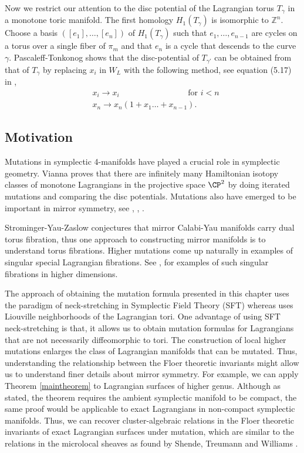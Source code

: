 Now we restrict our attention to the disc potential of the Lagrangian torus $T_\gamma$ in a monotone toric manifold. The first homology $H_1(T_\gamma)$ is isomorphic to $\mathbb{Z}^n$. Choose a basis $([e_1], \dots, [e_n])$ of $H_1(T_\gamma)$ such that $e_1, \dots, e_{n-1}$ are cycles on a torus over a single fiber of $\pi_m$ and that $e_n$ is a cycle that descends to the curve $\gamma$.  Pascaleff-Tonkonog \cite[p.~62]{wall} shows that the  disc-potential of $T_{\gamma'}$ can be obtained from that of $T_\gamma$ by replacing $x_i$ in $W_L$ with the following method,  see equation (5.17) in \cite{wall},
\begin{align}
    &x_i \longrightarrow x_i \qquad\qquad\qquad \qquad  \text{ for } i<n \label{eq:pasctonkmut}\\
    &x_n \longrightarrow x_n(1+x_1\dots + x_{n-1} ) \nonumber. 
\end{align}


\subsection{Motivation}


Mutations in symplectic 4-manifolds have played a crucial role in symplectic geometry.  Vianna \cite{vianna:infinitely} proves that there are infinitely many Hamiltonian isotopy classes of monotone Lagrangians in the projective space $\CP^2$ by doing iterated mutations and comparing the disc potentials.  Mutations also have emerged to be important in mirror symmetry,  see \cite{shetruwil:combi}, \cite{hackeating:hommirrLGcal},  \cite{hackkeating:symplecto}.  

Strominger-Yau-Zaslow \cite{syz:conje} conjectures that mirror Calabi-Yau manifolds carry dual torus fibration,  thus one approach to constructing mirror manifolds is to understand torus fibrations.  Higher mutations come up naturally in examples of singular special Lagrangian fibrations.  See \cite{matessi:lag3fib}\cite{gross:spclgeom}, \cite{gross:spcltop} for examples of such singular fibrations in higher dimensions.   

The approach of obtaining the mutation formula presented in this chapter uses the paradigm of neck-stretching in Symplectic Field Theory (SFT) whereas \cite{wall} uses Liouville neighborhoods of the Lagrangian tori.  One advantage of using SFT neck-stretching is that, it allows us to obtain mutation formulas for Lagrangians that are not necessarily diffeomorphic to tori. The construction of local higher mutations enlarges the class of Lagrangian manifolds that can be mutated.  Thus,  understanding the relationship between the Floer theoretic invariants  might allow us to understand finer details about mirror symmetry. For example, we can apply Theorem \ref{maintheorem} to Lagrangian surfaces of higher genus. Although as stated, the theorem requires the ambient symplectic manifold to be compact, the same proof would be applicable to exact Lagrangians in non-compact symplectic manifolds. Thus, we can recover cluster-algebraic relations in the Floer theoretic invariants of exact Lagrangian surfaces under mutation, which are similar to the relations in the microlocal sheaves as found by Shende, Treumann and Williams \cite{shentreuwill:oncombinatorics}.



